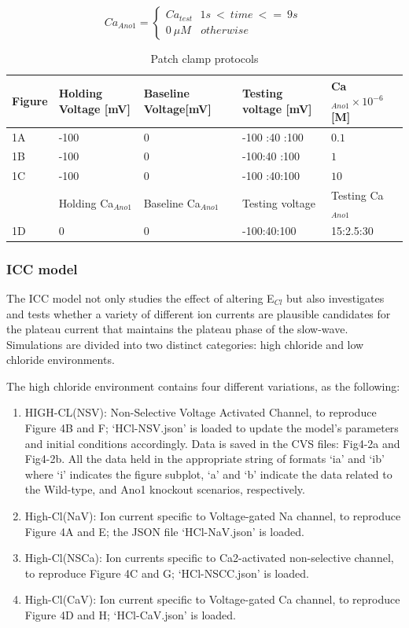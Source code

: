 \documentclass[fleqn,10pt]{physiome}
\begin{document}
\begin{equation}
  Ca_{Ano1} =
  \begin{cases}
   Ca_{test}  \  \ \   1s\ < \ time \ <= \ 9s\  \\ \label{eq:2}
   0\ \mu M  \ \ \  \ otherwise  \ \ \ \ \  \  \ \
  \end{cases}
\end{equation}
\begin{table}[hbt!]\centering
\begin{tabular}{lllll}\hline
Figure & Holding Voltage [mV] & Baseline Voltage[mV] & Testing voltage [mV] & Ca$_{Ano1}\times 10^{-6}$[M]\\ \hline
1A & -100  & 0  & -100 :40 :100  & $0.1$\\
1B & -100  & 0  & -100:40 :100  & $1$ \\
1C & -100 & 0  & -100 :40:100 & $10$\\ \hline   
& Holding Ca$_{Ano1}$ & Baseline Ca$_{Ano1}$ & Testing voltage &  Testing  Ca$_{Ano1}$\\ \hline  
1D &  0 & 0 & -100:40:100 & 15:2.5:30 \\\hline   
\end{tabular}\caption{Patch clamp protocols}\label{tab:Fig3}
\end{table}
\subsubsection{ICC model}
\label{ICC-model}
The ICC model not only studies the effect of altering E$_{Cl}$ but also investigates and tests whether a variety of different ion currents are plausible candidates for the plateau current that maintains the plateau phase of the slow-wave. Simulations are divided into two distinct categories: high chloride and low chloride environments.

The high chloride environment contains four different variations, as the following:
\begin{enumerate}
\item HIGH-CL(NSV): Non-Selective Voltage  Activated Channel, to reproduce Figure 4B and F; `HCl-NSV.json' is loaded to update the model's parameters and initial conditions accordingly. Data is saved in the CVS files:  Fig4-2a and Fig4-2b. All the data held in the appropriate string of formats `ia' and `ib' where `i' indicates the figure subplot, `a' and `b' indicate the data related to the Wild-type, and Ano1 knockout scenarios, respectively.  
\item High-Cl(NaV): Ion current specific to Voltage-gated Na channel, to reproduce Figure 4A and E; the JSON file `HCl-NaV.json' is loaded.
\item High-Cl(NSCa): Ion currents specific to Ca2-activated non-selective channel, to reproduce Figure  4C and G; `HCl-NSCC.json' is loaded.
\item High-Cl(CaV): Ion current specific to Voltage-gated  Ca channel, to reproduce Figure 4D and H; `HCl-CaV.json' is loaded.
\end{enumerate}
\end{document}
